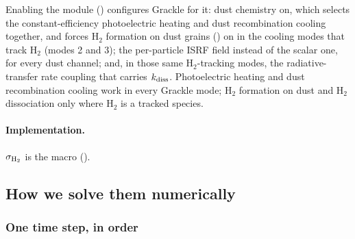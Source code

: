 Enabling the module ()
configures Grackle for it: dust chemistry on, which selects the
constant-efficiency photoelectric heating and dust recombination cooling
together, and forces H$_2$ formation on dust grains
() on in the cooling modes that track H$_2$
(modes 2 and 3); the per-particle ISRF field
instead of the scalar one, for every dust channel; and, in those same
H$_2$-tracking modes, the radiative-transfer rate coupling that carries
$k_{\rm diss}$. Photoelectric heating and dust recombination cooling
work in every Grackle mode; H$_2$ formation on dust and H$_2$
dissociation only where H$_2$ is a tracked species.

\paragraph{Implementation.} $\sigma_{\rm H_2}$ is the macro
 ().

\subsection{How we solve them numerically}
\label{sec:fuv-numerics}

\subsubsection{One time step, in order}
\label{sec:fuv-sequence}

